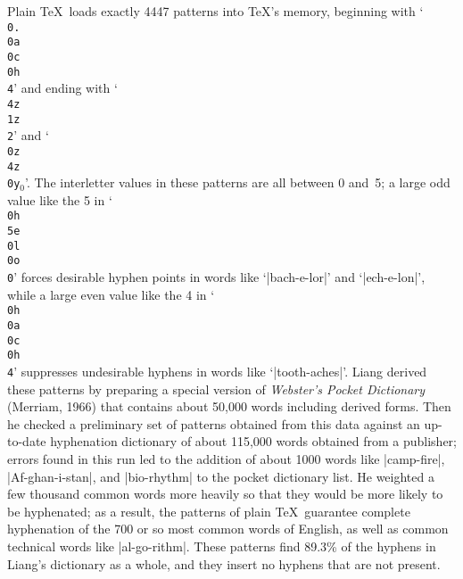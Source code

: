 Plain \TeX\ loads exactly 4447 patterns into \TeX's memory, beginning with
`{\tt\\0.\\0a\\0c\\0h\\4}' and ending with `{\tt\\4z\\1z\\2}' and
`{\tt\\0z\\4z\\0y$_0$}'. The interletter values in these patterns are all
between 0 and~5; a large odd value like the 5 in `{\tt\\0h\\5e\\0l\\0o\\0}'
forces desirable hyphen points in words like `|bach-e-lor|' and
`|ech-e-lon|', while a large even value like the 4 in `{\tt\\0h\\0a\\0c\\0h\\4}'
suppresses undesirable hyphens in words like `|tooth-aches|'. Liang
derived these patterns by preparing a special version of {\sl Webster's
Pocket Dictionary\/} (Merriam, 1966) that contains about 50,000 words including
derived forms. Then he checked a preliminary set of patterns obtained from
this data against an up-to-date hyphenation dictionary of about
115,000 words obtained from a publisher; errors found in this run
led to the addition of about 1000 words like |camp-fire|,
|Af-ghan-i-stan|, and |bio-rhythm| to the pocket dictionary list. He
weighted a few thousand common words more heavily so that they would be more
likely to be hyphenated; as a result, the patterns of plain \TeX\ guarantee
complete hyphenation of the 700 or so most common words of English,
as well as common technical words like |al-go-rithm|. These patterns
find 89.3\% of the hyphens in Liang's dictionary as a whole, and
they insert no hyphens that are not present.


